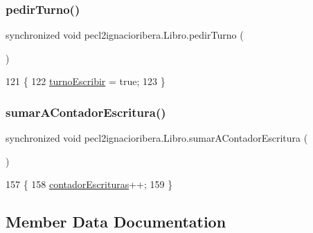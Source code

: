 \subsubsection{\texorpdfstring{pedir\+Turno()}{pedirTurno()}}
{\footnotesize\ttfamily synchronized void pecl2ignacioribera.\+Libro.\+pedir\+Turno (\begin{DoxyParamCaption}{ }\end{DoxyParamCaption})\hspace{0.3cm}{\ttfamily [inline]}}


\begin{DoxyCode}
121     \{
122         \mbox{\hyperlink{classpecl2ignacioribera_1_1_libro_a34d076d438d7b6309b4b499a94d52277}{turnoEscribir}} = \textcolor{keyword}{true};
123     \}
\end{DoxyCode}
\mbox{\label{classpecl2ignacioribera_1_1_libro_a2e74a67a271d83b8ce93e1807216c997}} 
\subsubsection{\texorpdfstring{sumar\+A\+Contador\+Escritura()}{sumarAContadorEscritura()}}
{\footnotesize\ttfamily synchronized void pecl2ignacioribera.\+Libro.\+sumar\+A\+Contador\+Escritura (\begin{DoxyParamCaption}{ }\end{DoxyParamCaption})\hspace{0.3cm}{\ttfamily [inline]}}


\begin{DoxyCode}
157     \{
158         \mbox{\hyperlink{classpecl2ignacioribera_1_1_libro_a85a779880390c56f68c584689668e3d0}{contadorEscrituras}}++;
159     \}
\end{DoxyCode}


\subsection{Member Data Documentation}
\mbox{\label{classpecl2ignacioribera_1_1_libro_a85a779880390c56f68c584689668e3d0}} 
